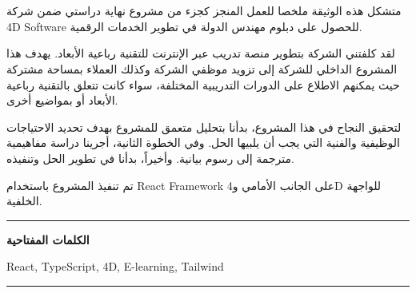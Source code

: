 \chapter*{}

\begin{RLtext}

 \noindent\hspace{10pt} متشكل هذه الوثيقة ملخصا للعمل المنجز كجزء من مشروع نهاية دراستي ضمن شركة 4D Software للحصول على دبلوم مهندس الدولة في تطوير الخدمات الرقمية.

 \vspace{10pt}

 لقد كلفتني الشركة بتطوير منصة تدريب عبر الإنترنت للتقنية رباعية الأبعاد. يهدف هذا المشروع الداخلي للشركة إلى تزويد موظفي الشركة وكذلك العملاء بمساحة مشتركة حيث يمكنهم الاطلاع على الدورات التدريبية المختلفة، سواء كانت تتعلق بالتقنية رباعية الأبعاد أو بمواضيع أخرى.

 \vspace{10pt}

 لتحقيق النجاح في هذا المشروع، بدأنا بتحليل متعمق للمشروع بهدف تحديد الاحتياجات الوظيفية والفنية التي يجب أن يلبيها الحل. وفي الخطوة الثانية، أجرينا دراسة مفاهيمية مترجمة إلى رسوم بيانية. وأخيراً، بدأنا في تطوير الحل وتنفيذه.

 \vspace{10pt}

 تم تنفيذ المشروع باستخدام React Framework على الجانب الأمامي و4D للواجهة الخلفية.

 \vspace{10pt}


\end{RLtext}

\noindent\rule[2pt]{\textwidth}{0.5pt}

\begin{RLtext}
    {\textbf{الكلمات المفتاحية}}
    \end{RLtext}
    \hfill
    React, TypeScript, 4D, E-learning, Tailwind
    



\noindent\rule[2pt]{\textwidth}{0.5pt}